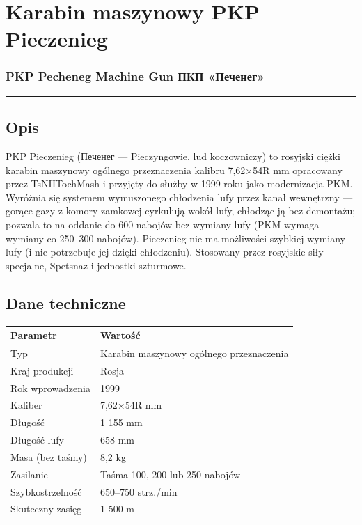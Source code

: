 \documentclass[12pt,openany,oneside]{book}
\begin{document}
\chapter{Karabin maszynowy PKP
Pieczenieg}\label{karabin-maszynowy-pkp-pieczenieg}

\subsection{PKP Pecheneg Machine Gun \textbar{} ПКП
«Печенег»}\label{pkp-pecheneg-machine-gun-ux43fux43aux43f-ux43fux435ux447ux435ux43dux435ux433}

\begin{center}\rule{0.5\linewidth}{0.5pt}\end{center}

\section{Opis}\label{opis-57}

PKP Pieczenieg (Печенег --- Pieczyngowie, lud koczowniczy) to rosyjski
ciężki karabin maszynowy ogólnego przeznaczenia kalibru 7,62×54R mm
opracowany przez TsNIITochMash i przyjęty do służby w 1999 roku jako
modernizacja PKM. Wyróżnia się systemem wymuszonego chłodzenia lufy
przez kanał wewnętrzny --- gorące gazy z komory zamkowej cyrkulują wokół
lufy, chłodząc ją bez demontażu; pozwala to na oddanie do 600 nabojów
bez wymiany lufy (PKM wymaga wymiany co 250--300 nabojów). Pieczenieg
nie ma możliwości szybkiej wymiany lufy (i nie potrzebuje jej dzięki
chłodzeniu). Stosowany przez rosyjskie siły specjalne, Spetsnaz i
jednostki szturmowe.

\section{Dane techniczne}\label{dane-techniczne-57}

\begin{longtable}[]{@{}ll@{}}
\toprule\noalign{}
Parametr & Wartość \\
\midrule\noalign{}
\endhead
\bottomrule\noalign{}
\endlastfoot
Typ & Karabin maszynowy ogólnego przeznaczenia \\
Kraj produkcji & Rosja \\
Rok wprowadzenia & 1999 \\
Kaliber & 7,62×54R mm \\
Długość & 1 155 mm \\
Długość lufy & 658 mm \\
Masa (bez taśmy) & 8,2 kg \\
Zasilanie & Taśma 100, 200 lub 250 nabojów \\
Szybkostrzelność & 650--750 strz./min \\
Skuteczny zasięg & 1 500 m \\
\end{longtable}
\end{document}
